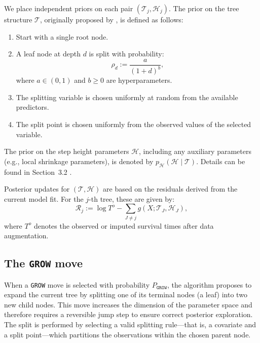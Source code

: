 We place independent priors on each pair $(\mathcal{T}_j, \mathcal{H}_j)$. The prior on the tree structure $\mathcal{T}$, originally proposed by \citet{BayesianCART}, is defined as follows:
\begin{enumerate}
    \item Start with a single root node.
    \item A leaf node at depth $d$ is split with probability:
    \begin{equation}\label{tree_prior}
        \rho_d := \frac{a}{(1 + d)^b},
    \end{equation}
    where $a \in (0, 1)$ and $b \geq 0$ are hyperparameters.
    \item The splitting variable is chosen uniformly at random from the available predictors.
    \item The split point is chosen uniformly from the observed values of the selected variable.
\end{enumerate}

The prior on the step height parameters $\mathcal{H}$, including any auxiliary parameters (e.g., local shrinkage parameters), is denoted by $p_\mathcal{H}(\mathcal{H} \mid \mathcal{T})$. Details can be found in Section~3.2 \citep{main_article}.

Posterior updates for $(\mathcal{T}, \mathcal{H})$ are based on the residuals derived from the current model fit. For the $j$-th tree, these are given by:
\begin{equation}\label{residuals_appendix}
\mathcal{R}_j := \log T^o - \sum_{J \ne j} g(X; \mathcal{T}_J, \mathcal{H}_J),
\end{equation}
where $T^o$ denotes the observed or imputed survival times after data augmentation.






\subsection{The \texttt{GROW} move}

When a \texttt{GROW} move is selected with probability $P_{\texttt{GROW}}$, the algorithm proposes to expand the current tree by splitting one of its terminal nodes (a leaf) into two new child nodes. 
This move increases the dimension of the parameter space and therefore requires a reversible jump step to ensure correct posterior exploration. 
The split is performed by selecting a valid splitting rule---that is, a covariate and a split point---which partitions the observations within the chosen parent node.

